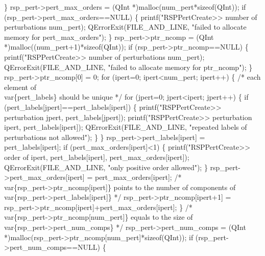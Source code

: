     \}
    rsp_pert->pert_max_orders = (QInt *)malloc(num_pert*sizeof(QInt));
    if (rsp_pert->pert_max_orders==NULL) \{
        printf("RSPPertCreate>> number of perturbations %
               num_pert);
        QErrorExit(FILE_AND_LINE, "failed to allocate memory for pert_max_orders");
    \}
    rsp_pert->ptr_ncomp = (QInt *)malloc((num_pert+1)*sizeof(QInt));
    if (rsp_pert->ptr_ncomp==NULL) \{
        printf("RSPPertCreate>> number of perturbations %
               num_pert);
        QErrorExit(FILE_AND_LINE, "failed to allocate memory for ptr_ncomp");
    \}
    rsp_pert->ptr_ncomp[0] = 0;
    for (ipert=0; ipert<num_pert; ipert++) \{
        /* each element of \\var\{pert_labels\} should be unique */
        for (jpert=0; jpert<ipert; jpert++) \{
            if (pert_labels[jpert]==pert_labels[ipert]) \{
                printf("RSPPertCreate>> perturbation %
                       jpert,
                       pert_labels[jpert]);
                printf("RSPPertCreate>> perturbation %
                       ipert,
                       pert_labels[ipert]);
                QErrorExit(FILE_AND_LINE, "repeated labels of perturbations not allowed");
            \}
        \}
        rsp_pert->pert_labels[ipert] = pert_labels[ipert];
        if (pert_max_orders[ipert]<1) \{
            printf("RSPPertCreate>> order of %
                   ipert,
                   pert_labels[ipert],
                   pert_max_orders[ipert]);
            QErrorExit(FILE_AND_LINE, "only positive order allowed");
        \}
        rsp_pert->pert_max_orders[ipert] = pert_max_orders[ipert];
        /* \\var\{rsp_pert->ptr_ncomp[ipert]\} points to the number of components of
           \\var\{rsp_pert->pert_labels[ipert]\} */
        rsp_pert->ptr_ncomp[ipert+1] = rsp_pert->ptr_ncomp[ipert]+pert_max_orders[ipert];
    \}
    /* \\var\{rsp_pert->ptr_ncomp[num_pert]\} equals to the size of \\var\{rsp_pert->pert_num_comps\} */
    rsp_pert->pert_num_comps = (QInt *)malloc(rsp_pert->ptr_ncomp[num_pert]*sizeof(QInt));
    if (rsp_pert->pert_num_comps==NULL) \{
